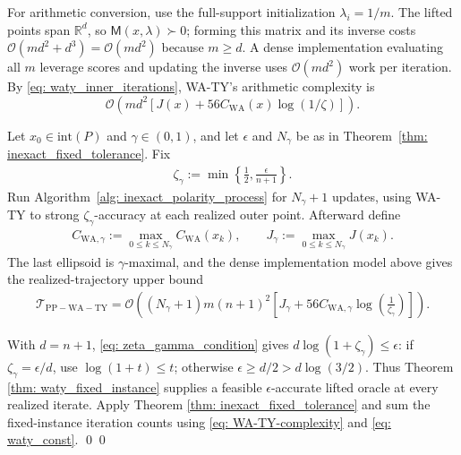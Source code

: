\documentclass[smallextended]{svjour3}
\let\springerproof\proof
\let\endspringerproof\endproof
\renewenvironment{proof}{\springerproof}{%
  \ifhmode\qed\else\leavevmode\qed\fi\endspringerproof}
\newcommand{\R}{\mathbb{R}}
\begin{document}
For arithmetic conversion, use the full-support initialization $\lambda_i=1/m$.
The lifted points
span $\R^d$, so $\mathsf M(x,\lambda)\succ0$; forming this matrix and its inverse
costs $\mathcal O(md^2+d^3)=\mathcal O(md^2)$ because $m\geq d$. A dense
implementation evaluating all $m$ leverage scores and updating the inverse uses
$\mathcal O(md^2)$ work per iteration. By \eqref{eq: waty_inner_iterations},
WA-TY's arithmetic complexity is
\begin{equation}\label{eq: WA-TY-complexity}
    \mathcal O\!\left(
    md^2\left[J(x)+56C_{\mathrm{WA}}(x)\log(1/\zeta)\right]\right).
\end{equation}

\begin{theorem}\label{thm: overall_arithmetic_complexity_waty}
    Let $x_0\in\mathrm{int}(P)$ and $\gamma\in(0,1)$, and let $\epsilon$ and
    $N_\gamma$ be as in Theorem~\ref{thm: inexact_fixed_tolerance}. Fix
    \begin{align}\label{eq: zeta_gamma_condition}
        \zeta_\gamma:=\min\left\{\frac12,\frac{\epsilon}{n+1}\right\}.
    \end{align}
    Run Algorithm~\ref{alg: inexact_polarity_process} for $N_\gamma+1$ updates,
    using WA-TY to strong $\zeta_\gamma$-accuracy at each realized outer point.
    Afterward define
    \begin{align}\label{eq: waty_const}
        C_{\mathrm{WA},\gamma}:=\max_{0\leq k\leq N_\gamma}C_{\mathrm{WA}}(x_k),
        \qquad
        J_\gamma:=\max_{0\leq k\leq N_\gamma}J(x_k).
    \end{align}
    The last ellipsoid is $\gamma$-maximal, and the dense implementation model
    above gives the realized-trajectory upper bound
    \begin{align*}
        \mathcal T_{\mathrm{PP-WA-TY}}
        =\mathcal O\!\left(
          (N_\gamma+1)m(n+1)^2
          \left[J_\gamma+56C_{\mathrm{WA},\gamma}
          \log\left(\frac1{\zeta_\gamma}\right)\right]
        \right).
    \end{align*}
\end{theorem}
\begin{proof}
    With $d=n+1$, \eqref{eq: zeta_gamma_condition} gives
    $d\log(1+\zeta_\gamma)\leq\epsilon$: if
    $\zeta_\gamma=\epsilon/d$, use $\log(1+t)\leq t$; otherwise
    $\epsilon\geq d/2>d\log(3/2)$. Thus Theorem
    \ref{thm: waty_fixed_instance} supplies a feasible $\epsilon$-accurate
    lifted oracle at every realized iterate. Apply Theorem
    \ref{thm: inexact_fixed_tolerance} and sum the fixed-instance iteration
    counts using \eqref{eq: WA-TY-complexity} and \eqref{eq: waty_const}.
\end{proof}
\end{document}
